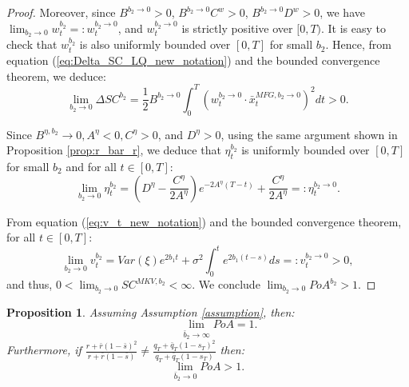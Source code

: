 \documentclass[11pt]{article}
\newtheorem{proposition}{Proposition}
\begin{document}
\begin{proof}
	
	Moreover, since $B^{b_2 \to 0}>0$, $B^{b_2 \to 0}C^w >0$, $B^{b_2\to 0}D^w > 0$, we have $\lim_{b_2 \to 0} w_t^{b_2}=:w_t^{b_2 \to 0}$, and $w_t^{b_2 \to 0}$ is strictly positive over $[0,T)$. It is easy to check that $w_t^{b_2}$ is also uniformly bounded over $[0,T]$ for small $b_2$. Hence, from equation (\ref{eq:Delta_SC_LQ_new_notation}) and the bounded convergence theorem, we deduce:
	\begin{equation*}
	\lim_{b_2 \to 0} \Delta SC^{b_2} = \frac{1}{2} B^{b_2\to 0} \int_0^T (w_t^{b_2 \to 0} \cdot \bar{x}_t^{MFG,b_2 \to 0})^2 dt >0.
	\end{equation*}
	
	
	Since $B^{\eta,b_2} \to 0, A^{\eta} < 0, C^{\eta} >0$, and $D^{\eta} > 0$, using the same argument shown in Proposition \ref{prop:r_bar_r}, 
	we deduce that $\eta_t^{b_2}$ is uniformly bounded over $[0,T]$ for small $b_2$ and for all $t \in[0,T]$:
	$$\lim_{b_2 \to 0}\eta_t^{b_2}=\left(D^{\eta} - \frac{C^{\eta}}{2A^\eta}\right) e^{-2A^\eta(T-t)} + \frac{C^\eta}{2A^{\eta} }=:\eta_t^{b_2 \to 0}.$$
	
	From equation (\ref{eq:v_t_new_notation}) and the bounded convergence theorem, for all $t \in [0,T]$:
	$$ \lim_{b_2 \to 0}v_t^{b_2}=Var(\xi) e^{2b_1 t} + \sigma^2 \int_0^t e^{2b_1 (t-s)} ds=:v_t^{b_2 \to 0}>0,$$
	and thus, $ 0 < \lim_{b_2 \to 0} SC^{MKV,b_2} < \infty.$ We conclude $\lim_{b_2 \to 0} PoA^{b_2} > 1.$
\end{proof}


\begin{proposition}
	Assuming Assumption \ref{assumption}, then:
	$$ \qquad\lim_{\bar{b}_2 \to \infty} PoA = 1.$$
	Furthermore, if	$\frac{r + \bar{r}(1- \bar{s})^2}{r + \bar{r}(1-\bar{s})} \neq \frac{q_T+\bar{q}_T(1-s_T)^2}{q_T+\bar{q}_T(1-s_T)}$ then:
	\begin{equation*}
	\lim_{\bar{b}_2 \to 0} PoA > 1. 
	\end{equation*}	
	\label{prop:b2bar}
\end{proposition}
\end{document}
